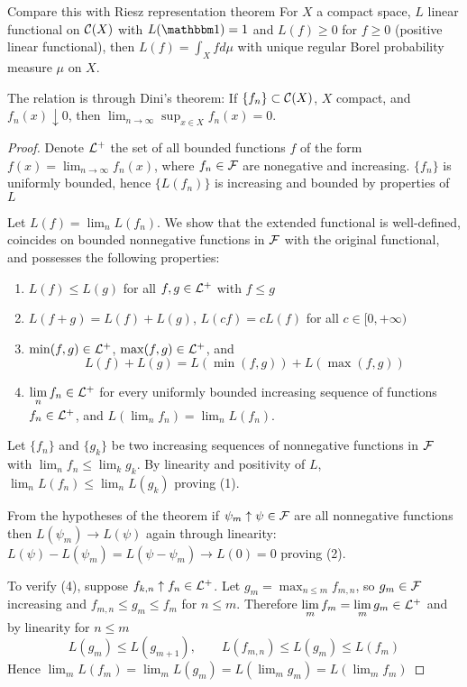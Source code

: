 \begin{note}{Compare this with Riesz representation theorem}
  For $X$ a compact space, $L$ linear functional on $\mathcal{C}(X)$
  with $L(\ind) = 1$ and $L(f) \geq 0$ for $f \geq 0$
  (positive linear functional),
  then $L(f) = \int_X f d\mu$
  with unique regular Borel probability measure $\mu$ on $X$.

  The relation is through Dini's theorem: If $\{f_n\} \subset \mathcal{C}(X)$,
  $X$ compact, and $f_n(x) \downarrow 0$,
  then $\lim_{n \to \infty} \sup_{x \in X} f_n(x) = 0$.
\end{note}

\begin{proof}
  Denote $\mathcal{L}^+$ the set of all bounded functions $f$
  of the form $f(x) = \lim_{n \to \infty} f_n(x)$, where
  $f_n \in \mathcal{F}$ are nonegative and increasing.
  $\{f_n\}$ is uniformly bounded, hence $\{L(f_n)\}$
  is increasing and bounded by properties of $L$

  Let $L(f) = \lim_n L(f_n)$.
  We show that the extended functional is well-defined, coincides
  on bounded nonnegative functions in $\mathcal{F}$ with the original functional,
  and possesses the following properties:
  \begin{enumerate}
    \item $L(f) \leq L(g)$ for all $f,g \in \mathcal{L}^+$ with $f \leq g$
    \item $L(f + g) = L(f) + L(g)$, $L(cf) = c L(f)$ for all $c \in [0, +\infty)$
    \item $\min(f,g) \in \mathcal{L}^+$, $\max(f,g) \in \mathcal{L}^+$, and
      \[
	L(f) + L(g) = L(\min(f,g)) + L(\max(f,g))
      \]
    \item $\lim_n f_n \in \cL^+$ for every uniformly bounded
      increasing sequence of functions $f_n \in \mathcal{L}^+$,
      and $L(\lim_n f_n) = \lim_n L(f_n)$.
  \end{enumerate}

  Let $\{f_n\}$ and $\{g_k\}$ be two increasing sequences of nonnegative
  functions in $\mathcal{F}$ with $\lim_n f_n \leq \lim_k g_k$. By linearity and
  positivity of $L$, $\lim_n L(f_n) \leq \lim_n L(g_k)$ proving (1).

  From the hypotheses of the theorem if $\psi_m \uparrow \psi \in \mathcal{F}$
  are all nonnegative functions then $L(\psi_m) \to L(\psi)$ again
  through linearity: $L(\psi) - L(\psi_m) = L(\psi - \psi_m) \to L(0) = 0$
  proving (2).

  To verify (4), suppose $f_{k,n} \uparrow f_n \in \mathcal{L}^+$.
  Let $g_m = \max_{n \leq m} f_{m,n}$, so $g_m \in \mathcal{F}$ increasing
  and $f_{m,n} \leq g_m \leq f_m$ for $n \leq m$.
  Therefore $\lim_m f_m = \lim_m g_m \in \cL^+$ and
  by linearity for $n \leq m$
  \[
    L(g_m) \leq L(g_{m+1}), \qquad L(f_{m,n}) \leq L(g_m) \leq L(f_m)
  \]
  Hence $\lim_m L(f_m) = \lim_m L(g_m) = L(\lim_m g_m) = L(\lim_m f_m)$


\end{proof}
